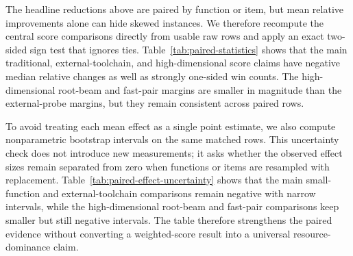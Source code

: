 \documentclass[11pt]{article}
\begin{document}
The headline reductions above are paired by function or item, but mean
relative improvements alone can hide skewed instances.  We therefore recompute
the central score comparisons directly from usable raw rows and apply an exact
two-sided sign test that ignores ties.  Table~\ref{tab:paired-statistics}
shows that the main traditional, external-toolchain, and high-dimensional
score claims have negative median relative changes as well as strongly
one-sided win counts.  The high-dimensional root-beam and fast-pair margins are
smaller in magnitude than the external-probe margins, but they remain
consistent across paired rows.

\begin{table}[H]
\centering
\scriptsize
\setlength{\tabcolsep}{3pt}
\renewcommand{\arraystretch}{1.06}
\caption{Paired statistical evidence for score comparisons.  Rows are
recomputed from correct, non-skipped raw CSV entries matched by item name.
Negative mean and median changes favor the target method; $\log_{10}p$ is from
a two-sided exact sign test over wins and losses, ignoring ties.}
\label{tab:paired-statistics}

\end{table}

To avoid treating each mean effect as a single point estimate, we also compute
nonparametric bootstrap intervals on the same matched rows.  This uncertainty
check does not introduce new measurements; it asks whether the observed effect
sizes remain separated from zero when functions or items are resampled with
replacement.  Table~\ref{tab:paired-effect-uncertainty} shows that the main
small-function and external-toolchain comparisons remain negative with narrow
intervals, while the high-dimensional root-beam and fast-pair comparisons keep
smaller but still negative intervals.  The table therefore strengthens the
paired evidence without converting a weighted-score result into a universal
resource-dominance claim.

\begin{table}[H]
\centering
\scriptsize
\setlength{\tabcolsep}{2pt}
\renewcommand{\arraystretch}{1.05}
\caption{Bootstrap uncertainty intervals for paired score-effect estimates.
Rows reuse the matched pairs from Table~\ref{tab:paired-statistics}.
Intervals are percentile bootstrap intervals over relative score changes;
negative values favor the target method.}
\label{tab:paired-effect-uncertainty}

\end{table}
\end{document}

